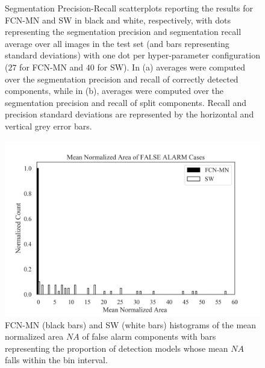 \documentclass[a4paper,authoryear,review]{elsarticle}
\begin{document}
\begin{figure}
\begin{subfigure}[b]{0.97\textwidth}
    \end{subfigure}
\caption{
Segmentation Precision-Recall scatterplots reporting the results for FCN-MN and SW in black and white, respectively, with dots representing the segmentation precision and segmentation recall average over all images in the test set (and bars representing standard deviations) with one dot per hyper-parameter configuration ($27$ for FCN-MN  and $40$ for SW). In (a) averages were computed over the segmentation precision and recall of correctly detected components, while in (b), averages were computed over the segmentation precision and recall of split components. Recall and precision standard deviations are represented by the horizontal and vertical grey error bars.
    }%
    \label{fig:Figure5}%
\end{figure}



\begin{figure}%
    \centering
      \includegraphics[width=\textwidth]{figures/Figure6.png}%
\caption{
FCN-MN (black bars) and SW (white bars) histograms of the mean normalized area $NA$ of false alarm components with bars representing the proportion of detection models whose mean $NA$ falls within the bin interval.
    }
\label{fig:Figure6}
\end{figure}
\end{document}
